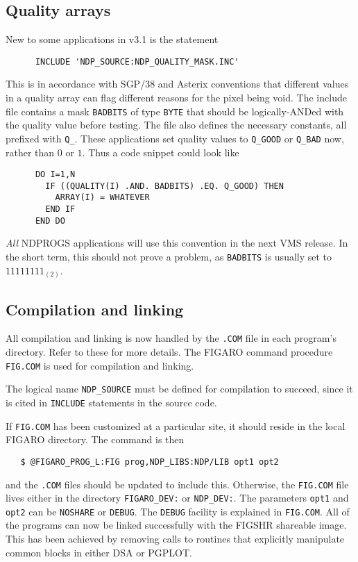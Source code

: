 \subsection{Quality arrays}

New to some applications in v3.1 is the statement
\begin{verbatim}
      INCLUDE 'NDP_SOURCE:NDP_QUALITY_MASK.INC'
\end{verbatim}
This is in accordance with SGP/38 and Asterix conventions that different values
in a quality array can flag different reasons for the pixel being void. The
include file contains a mask {\tt BADBITS} of type {\tt BYTE} that should be 
logically-ANDed with the quality value before testing. The file also defines 
the necessary constants, all prefixed with {\tt Q\_}. These applications set 
quality values to {\tt Q\_GOOD} or {\tt Q\_BAD} now, rather than $0$ or $1$. 
Thus a code snippet could look like
\begin{verbatim}
      DO I=1,N
        IF ((QUALITY(I) .AND. BADBITS) .EQ. Q_GOOD) THEN
          ARRAY(I) = WHATEVER
        END IF
      END DO
\end{verbatim}
{\em All} NDPROGS applications will use this convention in the next VMS release.
In the short term, this should not prove a problem, as {\tt BADBITS} is 
usually set to $11111111_{(2)}$.

\subsection{Compilation and linking}

All compilation and linking is now handled by the {\tt .COM} file in each
program's directory. Refer to these for more details.
The FIGARO command procedure {\tt FIG.COM} is used for compilation and 
linking. 

The logical name {\tt NDP\_SOURCE} must be defined for compilation to succeed, 
since it is cited in {\tt INCLUDE} statements in the source code. 

If {\tt FIG.COM} has been customized at a particular site, it should reside 
in the local FIGARO directory. The command is then 
\begin{verbatim}
   $ @FIGARO_PROG_L:FIG prog,NDP_LIBS:NDP/LIB opt1 opt2
\end{verbatim}
and the {\tt .COM} files should be updated to include this. Otherwise, the 
{\tt FIG.COM} file lives either in the directory {\tt FIGARO\_DEV:} or 
{\tt NDP\_DEV:}.
The parameters {\tt opt1} and {\tt opt2} can be {\tt NOSHARE} or {\tt DEBUG}.
The {\tt DEBUG} facility is explained in {\tt FIG.COM}. All of the programs 
can now be linked successfully with the FIGSHR shareable image. This has been
achieved by removing calls to routines that explicitly manipulate common blocks
in either DSA or PGPLOT.

